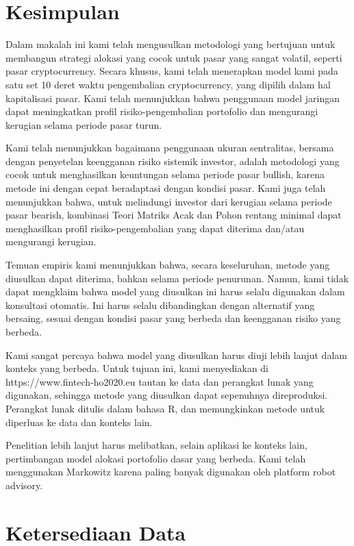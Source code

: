 \documentclass[12pt,a4paper]{article}
\begin{document}
\section{Kesimpulan}

Dalam makalah ini kami telah mengusulkan metodologi yang bertujuan untuk membangun strategi alokasi yang cocok untuk pasar yang sangat volatil, seperti pasar cryptocurrency. Secara khusus, kami telah menerapkan model kami pada satu set 10 deret waktu pengembalian cryptocurrency, yang dipilih dalam hal kapitalisasi pasar. Kami telah menunjukkan bahwa penggunaan model jaringan dapat meningkatkan profil risiko-pengembalian portofolio dan mengurangi kerugian selama periode pasar turun.

Kami telah menunjukkan bagaimana penggunaan ukuran sentralitas, bersama dengan penyetelan keengganan risiko sistemik investor, adalah metodologi yang cocok untuk menghasilkan keuntungan selama periode pasar bullish, karena metode ini dengan cepat beradaptasi dengan kondisi pasar. Kami juga telah menunjukkan bahwa, untuk melindungi investor dari kerugian selama periode pasar bearish, kombinasi Teori Matriks Acak dan Pohon rentang minimal dapat menghasilkan profil risiko-pengembalian yang dapat diterima dan/atau mengurangi kerugian.

Temuan empiris kami menunjukkan bahwa, secara keseluruhan, metode yang diusulkan dapat diterima, bahkan selama periode penurunan. Namun, kami tidak dapat mengklaim bahwa model yang diusulkan ini harus selalu digunakan dalam konsultasi otomatis. Ini harus selalu dibandingkan dengan alternatif yang bersaing, sesuai dengan kondisi pasar yang berbeda dan keengganan risiko yang berbeda.

Kami sangat percaya bahwa model yang diusulkan harus diuji lebih lanjut dalam konteks yang berbeda. Untuk tujuan ini, kami menyediakan di https://www.fintech-ho2020.eu tautan ke data dan perangkat lunak yang digunakan, sehingga metode yang diusulkan dapat sepenuhnya direproduksi. Perangkat lunak ditulis dalam bahasa R, dan memungkinkan metode untuk diperluas ke data dan konteks lain.

Penelitian lebih lanjut harus melibatkan, selain aplikasi ke konteks lain, pertimbangan model alokasi portofolio dasar yang berbeda. Kami telah menggunakan Markowitz karena paling banyak digunakan oleh platform robot advisory.

\section*{Ketersediaan Data}
\end{document}
